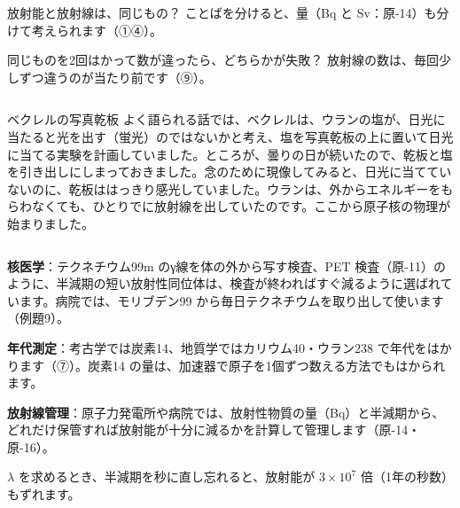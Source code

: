 \begin{tsumazuki}{放射能と放射線は、同じもの？}
ことばを分けると、量（Bq と Sv：原-14）も分けて考えられます（①④）。
\end{tsumazuki}

\begin{tsumazuki}{同じものを2回はかって数が違ったら、どちらかが失敗？}
放射線の数は、毎回少しずつ違うのが当たり前です（⑨）。
\end{tsumazuki}

\begin{column}{ベクレルの写真乾板}
よく語られる話では、ベクレルは、ウランの塩が、日光に当たると光を出す（蛍光）のではないかと考え、塩を写真乾板の上に置いて日光に当てる実験を計画していました。ところが、曇りの日が続いたので、乾板と塩を引き出しにしまっておきました。念のために現像してみると、日光に当てていないのに、乾板ははっきり感光していました。ウランは、外からエネルギーをもらわなくても、ひとりでに放射線を出していたのです。ここから原子核の物理が始まりました。
\end{column}

\begin{phkougaku}[半減期と放射能を使う技術]
\textbf{核医学}：テクネチウム99m のγ線を体の外から写す検査、PET 検査（原-11）のように、半減期の短い放射性同位体は、検査が終わればすぐ減るように選ばれています。病院では、モリブデン99 から毎日テクネチウムを取り出して使います（例題9）。

\textbf{年代測定}：考古学では炭素14、地質学ではカリウム40・ウラン238 で年代をはかります（⑦）。炭素14 の量は、加速器で原子を1個ずつ数える方法でもはかられます。

\textbf{放射線管理}：原子力発電所や病院では、放射性物質の量（Bq）と半減期から、どれだけ保管すれば放射能が十分に減るかを計算して管理します（原-14・原-16）。

\begin{phketa}[崩壊の数の目安]
$\lambda$ を求めるとき、半減期を秒に直し忘れると、放射能が $3\times10^7$ 倍（1年の秒数）もずれます。
\end{phketa}
\end{phkougaku}

